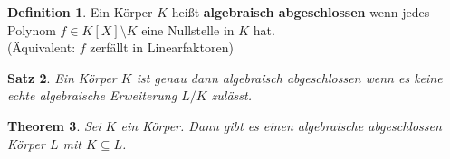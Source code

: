 \documentclass[10pt,a4paper]{article}
\theoremstyle{plain}
\newtheorem{theorem}{Theorem}[section]
\newtheorem{satz}[theorem]{Satz}
\theoremstyle{definition}
\newtheorem{definition}[theorem]{Definition}
\theoremstyle{remark}
\begin{document}
	\begin{definition}
		Ein Körper $K$ heißt \textbf{algebraisch abgeschlossen} wenn jedes Polynom $f\in K[X]\setminus K$ eine Nullstelle in $K$ hat.\\
		(Äquivalent: $f$ zerfällt in Linearfaktoren)
	\end{definition}

	\begin{satz}
		Ein Körper $K$ ist genau dann algebraisch abgeschlossen wenn es keine echte algebraische Erweiterung $L/K$ zulässt.
	\end{satz}

	\begin{theorem}
		Sei $K$ ein Körper. Dann gibt es einen algebraische abgeschlossen Körper $L$ mit $K\subseteq L$.
	\end{theorem}
\end{document}
